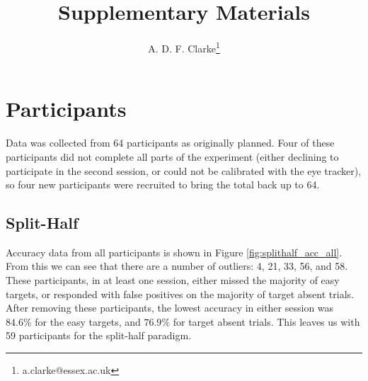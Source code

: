 \documentclass[a4paper, oneside, 11pt, onecolumn]{article}
\begin{document}
\title{Supplementary Materials}

\author{A. D. F. Clarke\thanks{a.clarke@essex.ac.uk}}

\maketitle

\begin{abstract}

\end{abstract}

\section{Participants}

Data was collected from 64 participants as originally planned. Four of these participants did not complete all parts of the experiment (either declining to participate in the second session, or could not be calibrated with the eye tracker), so four new participants were recruited to bring the total back up to 64. 

\subsection{Split-Half}

Accuracy data from all participants is shown in Figure \ref{fig:splithalf_acc_all}. From this we can see that there are a number of outliers: 4, 21, 33, 56, and 58. These participants, in at least one session, either missed the majority of easy targets, or responded with false positives on the majority of target absent trials. After removing these participants, the lowest accuracy in either session was $84.6\%$ for the easy targets, and $76.9\%$ for target absent trials. This leaves us with 59 participants for the split-half paradigm. 
\end{document}
